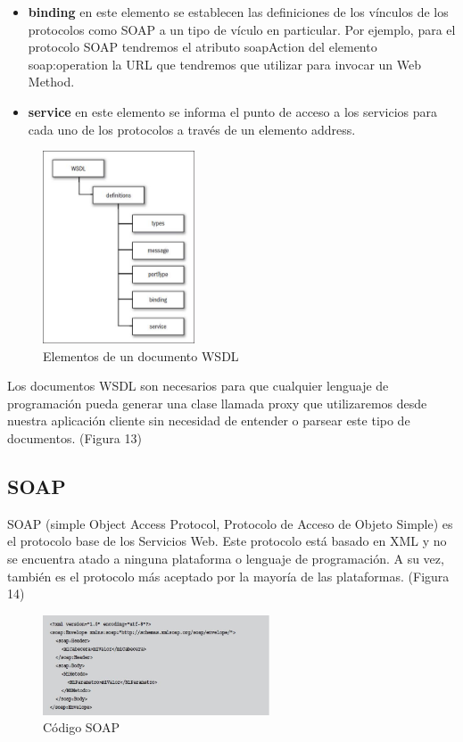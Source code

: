 \documentclass[12pt,letterpaper,titlepage]{article}
\begin{document}
\begin{itemize}\itemsep=0pt
\item \textbf{binding} en este elemento se establecen las definiciones de los vínculos de los protocolos como SOAP a un tipo de vículo en particular. Por ejemplo, para el protocolo SOAP tendremos el atributo soapAction del elemento soap:operation la URL que tendremos que utilizar para invocar un Web Method.
\item \textbf{service} en este elemento se informa el punto de acceso a los servicios para cada uno de los protocolos a través de un elemento address.
\end{itemize}

\begin{figure}
  \centering
    \includegraphics[width=0.4\textwidth]{13_wsdl}
  \caption{Elementos de un documento WSDL}
  \label{fig13:wsdl}
\end{figure}

Los documentos WSDL son necesarios para que cualquier lenguaje de programación pueda generar una clase llamada proxy que utilizaremos desde nuestra aplicación cliente sin necesidad de entender o parsear este tipo de documentos. (Figura 13)

\subsection{SOAP}\label{soap}
SOAP (simple Object Access Protocol, Protocolo de Acceso de Objeto Simple) es el protocolo base de los Servicios Web. Este protocolo está basado en XML y no se encuentra atado a ninguna plataforma o lenguaje de programación. A su vez, también es el protocolo más aceptado por la mayoría de las plataformas. (Figura 14)\\

\begin{figure}
  \centering
    \includegraphics[width=0.6\textwidth]{14_soap}
  \caption{Código SOAP}
  \label{fig14:soap}
\end{figure}
\end{document}
